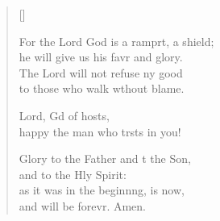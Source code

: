 \begin{verse}[\versewidth]
\begin{patverse}
For the Lord God is a ramprt, a shield;\Med\\
he will give us his favr and glory.\\
The Lord will not refuse ny good\Med\\
to those who walk w\pointup{\i}thout blame.

Lord, Gd of hosts,\Med\\
happy the man who trsts in you!

Glory to the Father and t the Son,\Med\\
and to the Hly Spirit:\\
as it was in the beginn\pointup{\i}ng, is now,\Med\\
and will be forevr. Amen. 
  \end{patverse}
\end{verse}
